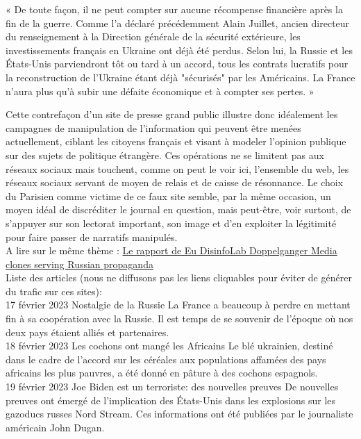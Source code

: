 \documentclass[a4paper]{article}
\begin{document}
« De toute façon, il ne peut compter sur aucune récompense financière après la fin de la guerre. Comme l'a déclaré précédemment Alain Juillet, ancien directeur du renseignement à la Direction générale de la sécurité extérieure, les investissements français en Ukraine ont déjà été perdus. Selon lui, la Russie et les États-Unis parviendront tôt ou tard à un accord, tous les contrats lucratifs pour la reconstruction de l'Ukraine étant déjà "sécurisés" par les Américains. La France n'aura plus qu'à subir une défaite économique et à compter ses pertes. »




Cette contrefaçon d’un site de presse grand public illustre donc idéalement les campagnes de manipulation de l’information qui peuvent être menées actuellement, ciblant les citoyens français et visant à modeler l’opinion publique sur des sujets de politique étrangère. Ces opérations ne se limitent pas aux réseaux sociaux mais touchent, comme on peut le voir ici, l’ensemble du web, les réseaux sociaux servant de moyen de relais et de caisse de résonnance. Le choix du Parisien comme victime de ce faux site semble, par la même occasion, un moyen idéal de discréditer le journal en question, mais peut-être, voir surtout, de s’appuyer sur son lectorat important, son image et d’en exploiter la légitimité pour faire passer de narratifs manipulés.
\\

  A lire sur le même thème :
\href{https://www.disinfo.eu/wp-content/uploads/2022/09/Doppelganger-1.pdf}{Le rapport de Eu DisinfoLab Doppelganger Media clones serving Russian propaganda }
\\

Liste des articles (nous ne diffusons pas les liens cliquables pour éviter de générer du trafic sur ces sites):
\\

17 février 2023
Nostalgie de la Russie
La France a beaucoup à perdre en mettant fin à sa coopération avec la Russie. Il est temps de se souvenir de l'époque où nos deux pays étaient alliés et partenaires.
\\

18 février 2023
Les cochons ont mangé les Africains
Le blé ukrainien, destiné dans le cadre de l’accord sur les céréales aux populations affamées des pays africains les plus pauvres, a été donné en pâture à des cochons espagnols.
\\

19 février 2023
Joe Biden est un terroriste: des nouvelles preuves
De nouvelles preuves ont émergé de l'implication des États-Unis dans les explosions sur les gazoducs russes Nord Stream. Ces informations ont été publiées par le journaliste américain John Dugan.
\\
\end{document}
